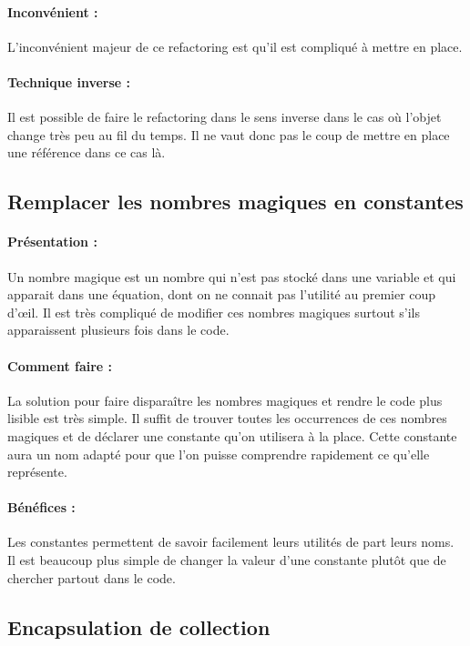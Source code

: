 \documentclass[a4paper,twoside,12pt,openright]{report}
\begin{document}
\paragraph{Inconvénient :}
L'inconvénient majeur de ce refactoring est qu'il est compliqué à mettre en place.

\paragraph{Technique inverse :}
Il est possible de faire le refactoring dans le sens inverse dans le cas où l'objet change très peu au fil du temps. Il ne vaut donc pas le coup de mettre en place une référence dans ce cas là.\\


\subsection{Remplacer les nombres magiques en constantes}
\paragraph{Présentation :}
Un nombre magique est un nombre qui n'est pas stocké dans une variable et qui apparait dans une équation, dont on ne connait pas l'utilité au premier coup d'œil. Il est très compliqué de modifier ces nombres magiques surtout s'ils apparaissent plusieurs fois dans le code.

\paragraph{Comment faire :}
La solution pour faire disparaître les nombres magiques et rendre le code plus lisible est très simple. Il suffit de trouver toutes les occurrences de ces nombres magiques et de déclarer une constante qu'on utilisera à la place. Cette constante aura un nom adapté pour que l'on puisse comprendre rapidement ce qu'elle représente.

\paragraph{Bénéfices :}
Les constantes permettent de savoir facilement leurs utilités de part leurs noms.\\
Il est beaucoup plus simple de changer la valeur d'une constante plutôt que de chercher partout dans le code.\\

\subsection{Encapsulation de collection}
\end{document}
